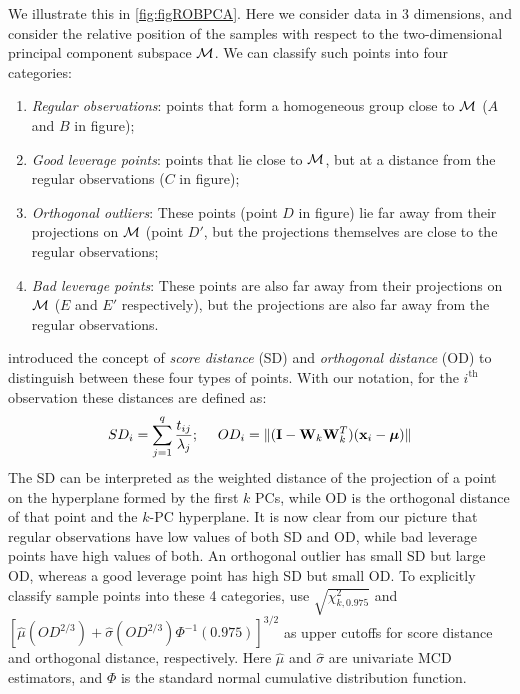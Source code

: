 We illustrate this in \ref{fig:figROBPCA}. Here we consider data in 3 dimensions, and consider the relative position of the samples with respect to the two-dimensional principal component subspace ${\cal{M}}$. We can classify such points into four categories:

\begin{enumerate}
\item{\it Regular observations}: points that form a homogeneous group close to ${\cal{M}}$ ($A$ and $B$ in figure);
\item{\it Good leverage points}: points that lie close to ${\cal{M}}$, but at a distance from the regular observations ($C$ in figure);
\item{\it Orthogonal outliers}: These points (point $D$ in figure) lie far away from their projections on ${\cal{M}}$ (point $D'$, but the projections themselves are close to the regular observations;
\item{\it Bad leverage points}: These points are also far away from their projections on ${\cal{M}}$ ($E$ and $E'$ respectively), but the projections are also far away from the regular observations.
\end{enumerate}

\cite{hubert05} introduced the concept of \textit{score distance} (SD) and \textit{orthogonal distance} (OD) to distinguish between these four types of points. With our notation, for the $i^\text{th}$ observation these distances are defined as:
%
$$
SD_i = \sum_{j=1}^q \frac{t_{ij}}{\lambda_j};\
\quad OD_i  =\| ( {\mathbf{I}} - {\mathbf{W}}_k {\mathbf{W}}_k^T) ({\bf{x}}_i - {\boldsymbol{\mu}}) \|
$$
%
The SD can be interpreted as the weighted distance of the projection of a point on the hyperplane formed by the first $k$ PCs, while OD is the orthogonal distance of that point and the $k$-PC hyperplane. It is now clear from our picture that regular observations have low values of both SD and OD, while bad leverage points have high values of both. An orthogonal outlier has small SD but large OD, whereas a good leverage point has high SD but small OD. To explicitly classify sample points into these 4 categories, \cite{hubert05} use $\sqrt {\chi^2_{k,0.975}}$ and $[ \hat \mu (OD^{2/3}) + \hat \sigma (OD^{2/3}) \Phi^{-1} (0.975) ]^{3/2}$ as upper cutoffs for score distance and orthogonal distance, respectively. Here $\hat \mu$ and $\hat \sigma$ are univariate MCD estimators, and $\Phi$ is the standard normal cumulative distribution function.